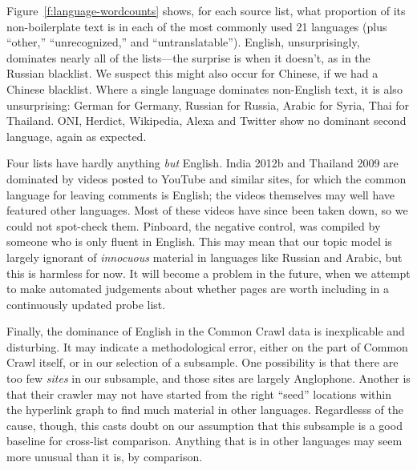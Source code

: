 Figure~\ref{f:language-wordcounts} shows, for each source list, what
proportion of its non-boilerplate text is in each of the most commonly
used 21 languages (plus “other,” “unrecognized,” and
“untranslatable”).  English, unsurprisingly, dominates nearly all of
the lists---the surprise is when it doesn't, as in the Russian
blacklist.  We suspect this might also occur for Chinese, if we had a
Chinese blacklist.  Where a single language dominates non-English
text, it is also unsurprising: German for Germany, Russian for Russia,
Arabic for Syria, Thai for Thailand.  ONI, Herdict, Wikipedia, Alexa
and Twitter show no dominant second language, again as expected.

Four lists have hardly anything \emph{but} English.  India 2012b and
Thailand 2009 are dominated by videos posted to YouTube and similar
sites, for which the common language for leaving comments is English;
the videos themselves may well have featured other languages.  Most
of these videos have since been taken down, so we could not spot-check
them.  Pinboard, the negative control, was compiled by someone who is
only fluent in English.  This may mean that our topic model is largely
ignorant of \emph{innocuous} material in languages like Russian and
Arabic, but this is harmless for now.  It will become a problem in
the future, when we attempt to make automated judgements about whether
pages are worth including in a continuously updated probe list.

Finally, the dominance of English in the Common Crawl data is
inexplicable and disturbing.  It may indicate a methodological error,
either on the part of Common Crawl itself, or in our selection of a
subsample.  One possibility is that there are too few \emph{sites} in
our subsample, and those sites are largely Anglophone.  Another is
that their crawler may not have started from the right “seed”
locations within the hyperlink graph to find much material in other
languages.  Regardlesss of the cause, though, this casts doubt on our
assumption that this subsample is a good baseline for cross-list
comparison.  Anything that is in other languages may seem more unusual
than it is, by comparison.
